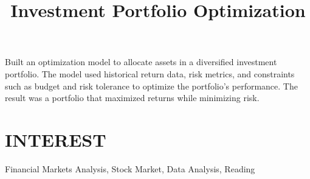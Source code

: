 \documentclass[margin]{res}
\begin{document}
\begin{resume}
\title{\textbf{Investment Portfolio Optimization}}
\begin{position}
 Built an optimization model to allocate assets in a diversified investment portfolio. The model used historical return data, risk metrics, and constraints such as budget and risk tolerance to optimize the portfolio’s performance. The result was a portfolio that maximized returns while minimizing risk.
\end{position}

\section{INTEREST}
Financial Markets Analysis, Stock Market, Data Analysis, Reading
\end{resume}
\end{document}
